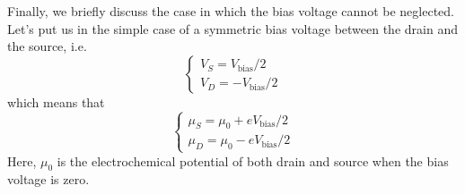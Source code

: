 \documentclass[a4paper,twoside,11pt]{book}
\begin{document}
Finally, we briefly discuss the case in which the bias voltage cannot be neglected. Let's put us in the simple case of a symmetric bias voltage between the drain and the source, i.e.
\begin{equation}
	\begin{cases}
		V_S = V_{\text{bias}}/2 \\
		V_D = -V_{\text{bias}}/2
	\end{cases}
\end{equation}
which means that
\begin{equation}
	\begin{cases}
		\mu_S = \mu_0 + eV_{\text{bias}}/2 \\
		\mu_D = \mu_0 - eV_{\text{bias}}/2
	\end{cases}
\end{equation}
Here, $\mu_0$ is the electrochemical potential of both drain and source when the bias voltage is zero.
\end{document}
